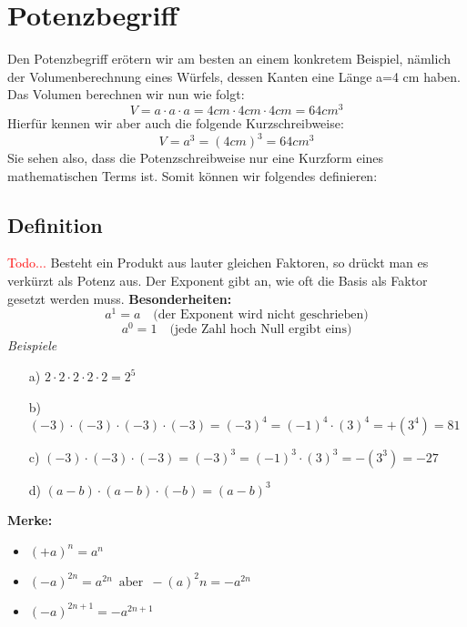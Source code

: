 \documentclass[11pt, a4paper, twoside, fleqn]{article}
\begin{document}
\section{Potenzbegriff}
Den Potenzbegriff erötern wir am besten an einem konkretem Beispiel, nämlich der Volumenberechnung eines Würfels, dessen Kanten eine Länge a=4 cm haben. Das Volumen berechnen wir nun wie folgt:
\[V= a \cdot a \cdot a = 4 cm \cdot 4 cm \cdot 4cm = 64cm^3 \]
Hierfür kennen wir aber auch die folgende Kurzschreibweise:
\[V= a^3 = (4cm)^3 = 64 cm^3 \]
Sie sehen also, dass die Potenzschreibweise nur eine Kurzform eines mathematischen Terms ist. Somit können wir folgendes definieren:
\subsection{Definition}
\textcolor{red}{Todo...}
\vskip 10pt
Besteht ein Produkt aus lauter gleichen Faktoren, so drückt man es verkürzt als Potenz aus. Der Exponent gibt an, wie oft die Basis als Faktor gesetzt werden muss.
\vskip 10pt
\textbf{Besonderheiten:}
\[a^1 = a \quad \text{(der Exponent wird nicht geschrieben)} \]
\[a^0 = 1 \quad \text{(jede Zahl hoch Null ergibt eins)} \]
\vskip 10pt
\emph{Beispiele}
\begin{itemize}
\setlength{\itemsep}{0pt}
\item[a)] $ 2\cdot 2\cdot 2\cdot 2\cdot2= 2^{5} $
\item[b)] $ (-3)\cdot(-3)\cdot(-3)\cdot(-3) = (-3)^4 = (-1)^4\cdot (3)^4 = +(3^4) = 81 $
\item[c)] $ (-3)\cdot(-3)\cdot(-3) = (-3)^3 = (-1)^3 \cdot (3)^3 = -(3^3) = -27 $
\item[d)] $ (a-b) \cdot (a-b)\cdot (-b) = (a-b)^3 $
\end{itemize}
\vskip 10pt
\textbf{Merke:}
\begin{itemize}
\setlength{\itemsep}{0pt}
\item $ (+a)^n = a^n $
\item $ (-a)^{2n} = a^{2n} \enspace \text{aber} \enspace - (a)^2n = -a^{2n} $ 
\item $ (-a)^{2n+1} = -a^{2n+1} $
\end{itemize}
\newpage
\end{document}
